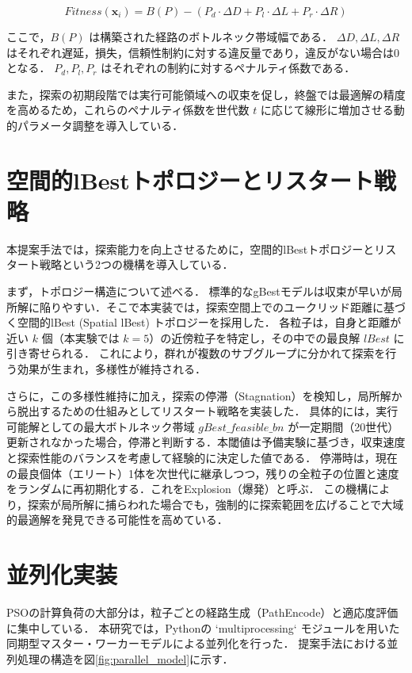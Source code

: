 \begin{equation}
 Fitness(\boldsymbol{x}_i) = B(P) - \left( P_d \cdot \Delta D + P_l \cdot \Delta L + P_r \cdot \Delta R \right)
\end{equation}

ここで，$B(P)$ は構築された経路のボトルネック帯域幅である．
$\Delta D, \Delta L, \Delta R$ はそれぞれ遅延，損失，信頼性制約に対する違反量であり，違反がない場合は0となる．
$P_d, P_l, P_r$ はそれぞれの制約に対するペナルティ係数である．

また，探索の初期段階では実行可能領域への収束を促し，終盤では最適解の精度を高めるため，これらのペナルティ係数を世代数 $t$ に応じて線形に増加させる動的パラメータ調整を導入している．

\section{空間的lBestトポロジーとリスタート戦略}
本提案手法では，探索能力を向上させるために，空間的lBestトポロジーとリスタート戦略という2つの機構を導入している．

まず，トポロジー構造について述べる．
標準的なgBestモデルは収束が早いが局所解に陥りやすい．そこで本実装では，探索空間上でのユークリッド距離に基づく空間的lBest (Spatial lBest) トポロジーを採用した．
各粒子は，自身と距離が近い $k$ 個（本実験では $k=5$）の近傍粒子を特定し，その中での最良解 $lBest$ に引き寄せられる．
これにより，群れが複数のサブグループに分かれて探索を行う効果が生まれ，多様性が維持される．

さらに，この多様性維持に加え，探索の停滞（Stagnation）を検知し，局所解から脱出するための仕組みとしてリスタート戦略を実装した．
具体的には，実行可能解としての最大ボトルネック帯域 $gBest\_feasible\_bn$ が一定期間（20世代）更新されなかった場合，停滞と判断する．本閾値は予備実験に基づき，収束速度と探索性能のバランスを考慮して経験的に決定した値である．
停滞時は，現在の最良個体（エリート）1体を次世代に継承しつつ，残りの全粒子の位置と速度をランダムに再初期化する．これをExplosion（爆発）と呼ぶ．
この機構により，探索が局所解に捕らわれた場合でも，強制的に探索範囲を広げることで大域的最適解を発見できる可能性を高めている．

\section{並列化実装}
PSOの計算負荷の大部分は，粒子ごとの経路生成（PathEncode）と適応度評価に集中している．
本研究では，Pythonの `multiprocessing` モジュールを用いた同期型マスター・ワーカーモデルによる並列化を行った．
提案手法における並列処理の構造を図\ref{fig:parallel_model}に示す．

